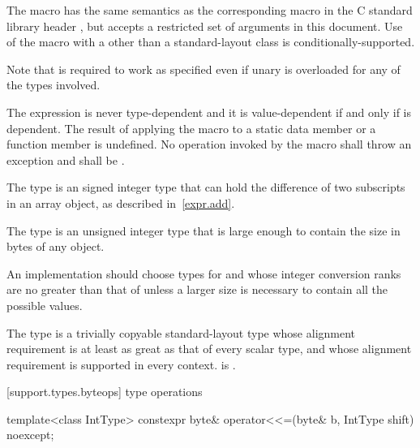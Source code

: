\pnum
The macro
%
has the same semantics as the corresponding macro in
the C standard library header , but
accepts a restricted set of 
arguments in this document.
Use of the  macro with a 
other than a standard-layout class
is conditionally-supported.
\begin{footnote}
Note that 
is required to work as specified even if unary
is overloaded for any of the types involved.
\end{footnote}
The expression 
is never type-dependent and it is
value-dependent if and only if  is
dependent. The result of applying the  macro to
a static data member or a function member is undefined.
No operation invoked by the  macro shall throw an exception and
 shall be .

\pnum
The type  is an
signed integer type that can
hold the difference of two subscripts in an array object, as described in~\ref{expr.add}.

\pnum
The type  is an
unsigned integer type that is large enough
to contain the size in bytes of any object.

\pnum
\recommended
An implementation should choose types for  and 
whose integer conversion ranks are no greater than that of
 unless a larger size is necessary to contain all the possible values.

\pnum
The type
%
 is a trivially copyable standard-layout type whose alignment requirement
is at least as great as that of every scalar type, and whose alignment
requirement is supported in every context.
 is .


[support.types.byteops]{ type operations}

%
\begin{itemdecl}
template<class IntType>
  constexpr byte& operator<<=(byte& b, IntType shift) noexcept;
\end{itemdecl}

